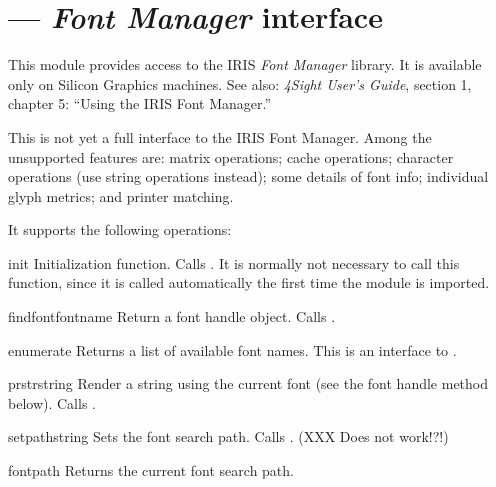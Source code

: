 \section{ ---
         \emph{Font Manager} interface}



This module provides access to the IRIS \emph{Font Manager} library.
It is available only on Silicon Graphics machines.
See also: \emph{4Sight User's Guide}, section 1, chapter 5: ``Using
the IRIS Font Manager.''

This is not yet a full interface to the IRIS Font Manager.
Among the unsupported features are: matrix operations; cache
operations; character operations (use string operations instead); some
details of font info; individual glyph metrics; and printer matching.

It supports the following operations:

\begin{funcdesc}{init}{}
Initialization function.
Calls .
It is normally not necessary to call this function, since it is called
automatically the first time the  module is imported.
\end{funcdesc}

\begin{funcdesc}{findfont}{fontname}
Return a font handle object.
Calls .
\end{funcdesc}

\begin{funcdesc}{enumerate}{}
Returns a list of available font names.
This is an interface to .
\end{funcdesc}

\begin{funcdesc}{prstr}{string}
Render a string using the current font (see the  font
handle method below).
Calls .
\end{funcdesc}

\begin{funcdesc}{setpath}{string}
Sets the font search path.
Calls .
(XXX Does not work!?!)
\end{funcdesc}

\begin{funcdesc}{fontpath}{}
Returns the current font search path.
\end{funcdesc}

